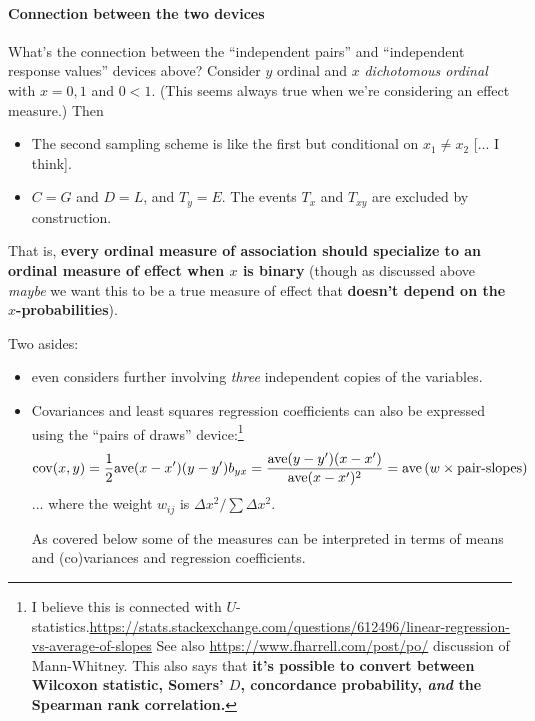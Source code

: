 \documentclass[
  11pt,
  fleqn
]{article}
\begin{document}
\paragraph{Connection between the two devices}What's the connection
between the ``independent pairs'' and ``independent response values''
devices above? Consider $y$ ordinal
and $x$ \emph{dichotomous ordinal} with $x = 0, 1$ and $0 < 1$. (This
seems always true when we're considering an effect measure.) Then
\begin{itemize}
  \item The second sampling scheme is like the first but conditional
    on $x_1 \neq x_2$ [... I think].
  \item $C = G$ and $D = L$, and $T_y = E$. The events $T_x$ and
    $T_{xy}$ are excluded by construction.
\end{itemize}
That is, \textbf{every ordinal measure of association should
specialize to an ordinal measure of effect when $x$ is binary}
(though as discussed above \emph{maybe} we want this to be a true measure of
effect that \textbf{doesn't depend on the $x$-probabilities}).

Two asides:

\begin{itemize}
  \item \citet{kruskalOrdinalMeasuresAssociation1958} even
    considers further involving \emph{three} independent copies of
    the variables.
  \item Covariances and least squares regression coefficients can also be
    expressed using the ``pairs of draws'' device:\footnote{ I believe this is
      connected with
      $U$-statistics.\url{https://stats.stackexchange.com/questions/612496/linear-regression-vs-average-of-slopes}
      See also \url{https://www.fharrell.com/post/po/} discussion of
      Mann-Whitney. This also says that \textbf{it's possible to
        convert between Wilcoxon statistic, Somers' $D$, concordance
      probability, \emph{and} the Spearman rank correlation.}
    } \[ \mathrm{cov}(x, y) = \frac{1}{2}\mathrm{ave}(x - x')(y - y') \\ b_{yx} =
      \frac{\mathrm{ave} (y -
      y')(x - x')}{\mathrm{ave} (x - x')^2} = {\mathrm{ave} \left(w \times
      \text{pair-slopes}\right)}
    \]
    ... where the weight $w_{ij}$ is ${\Delta x^2}\big/{\sum \Delta x^2}$.

    As covered below some of the measures can be interpreted in terms
    of means and (co)variances and regression coefficients.
\end{itemize}
\end{document}
